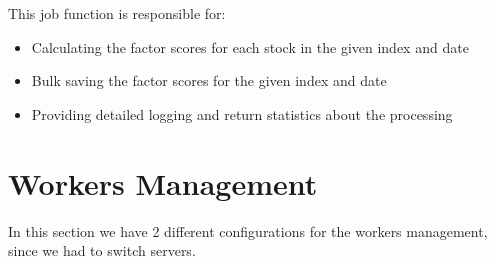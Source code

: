 \documentclass[11pt,english,a4paper,hidelinks]{book}
\begin{document}
\noindent This job function is responsible for:
\begin{itemize}
    \item Calculating the factor scores for each stock in the given index and date
    \item Bulk saving the factor scores for the given index and date
    \item Providing detailed logging and return statistics about the processing
\end{itemize}

\section{Workers Management}

In this section we have 2 different configurations for the workers management, since we had to switch servers.
\end{document}
